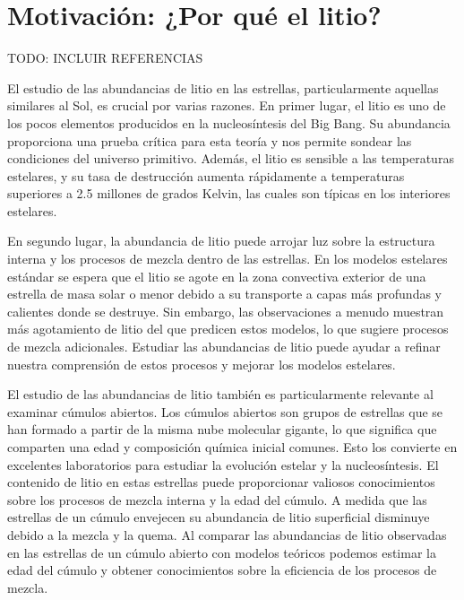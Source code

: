 
\chapter{Motivación: ¿Por qué el litio?}\label{ch:primer-capitulo}

TODO: INCLUIR REFERENCIAS

El estudio de las abundancias de litio en las estrellas, particularmente aquellas similares al Sol, es crucial por varias razones. En primer lugar, el litio es uno de los pocos elementos producidos en la nucleosíntesis del Big Bang. Su abundancia proporciona una prueba crítica para esta teoría y nos permite sondear las condiciones del universo primitivo. Además, el litio es sensible a las temperaturas estelares, y su tasa de destrucción aumenta rápidamente a temperaturas superiores a 2.5 millones de grados Kelvin, las cuales son típicas en los interiores estelares.\par

En segundo lugar, la abundancia de litio puede arrojar luz sobre la estructura interna y los procesos de mezcla dentro de las estrellas. En los modelos estelares estándar se espera que el litio se agote en la zona convectiva exterior de una estrella de masa solar o menor debido a su transporte a capas más profundas y calientes donde se destruye. Sin embargo, las observaciones a menudo muestran más agotamiento de litio del que predicen estos modelos, lo que sugiere procesos de mezcla adicionales. Estudiar las abundancias de litio puede ayudar a refinar nuestra comprensión de estos procesos y mejorar los modelos estelares.\par

El estudio de las abundancias de litio también es particularmente relevante al examinar cúmulos abiertos. Los cúmulos abiertos son grupos de estrellas que se han formado a partir de la misma nube molecular gigante, lo que significa que comparten una edad y composición química inicial comunes. Esto los convierte en excelentes laboratorios para estudiar la evolución estelar y la nucleosíntesis. El contenido de litio en estas estrellas puede proporcionar valiosos conocimientos sobre los procesos de mezcla interna y la edad del cúmulo. A medida que las estrellas de un cúmulo envejecen su abundancia de litio superficial disminuye debido a la mezcla y la quema. Al comparar las abundancias de litio observadas en las estrellas de un cúmulo abierto con modelos teóricos podemos estimar la edad del cúmulo y obtener conocimientos sobre la eficiencia de los procesos de mezcla.\par

